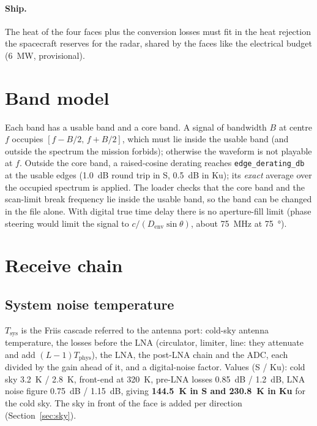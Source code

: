 \documentclass[11pt,a4paper]{article}
\newcommand{\Tsys}{T_{\mathrm{sys}}}
\newcommand{\Denv}{D_{\mathrm{env}}}
\begin{document}
\paragraph{Ship.} The heat of the four faces plus the conversion losses must fit in the heat rejection the spacecraft
reserves for the radar, shared by the faces like the electrical budget (\SI{6}{MW}, provisional).

\section{Band model}
Each band has a usable band and a core band. A signal of bandwidth $B$ at centre $f$ occupies
$[f-B/2,\,f+B/2]$, which must lie inside the usable band (and outside the spectrum the mission forbids); otherwise the
waveform is not playable at $f$. Outside the core band, a raised-cosine derating reaches \texttt{edge\_derating\_db} at
the usable edges (\SI{1.0}{dB} round trip in S, \SI{0.5}{dB} in Ku); its \emph{exact} average over the occupied
spectrum is applied. The loader checks that the core band and the scan-limit break frequency lie inside the usable
band, so the band can be changed in the file alone. With digital true time delay there is no aperture-fill limit
(phase steering would limit the signal to $c/(\Denv\sin\theta)$, about \SI{75}{MHz} at \SI{75}{\degree}).

\section{Receive chain}\label{sec:rx}

\subsection{System noise temperature}
$\Tsys$ is the Friis cascade referred to the antenna port: cold-sky antenna temperature, the losses before the LNA
(circulator, limiter, line: they attenuate and add $(L-1)T_{\mathrm{phys}}$), the LNA, the post-LNA chain and the ADC,
each divided by the gain ahead of it, and a digital-noise factor. Values (S / Ku): cold sky \SI{3.2}{K} / \SI{2.8}{K},
front-end at \SI{320}{K}, pre-LNA losses \SI{0.85}{dB} / \SI{1.2}{dB}, LNA noise figure \SI{0.75}{dB} / \SI{1.15}{dB},
giving \textbf{\SI{144.5}{K} in S and \SI{230.8}{K} in Ku} for the cold sky. The sky in front of the face is added per
direction (Section~\ref{sec:sky}).
\end{document}

